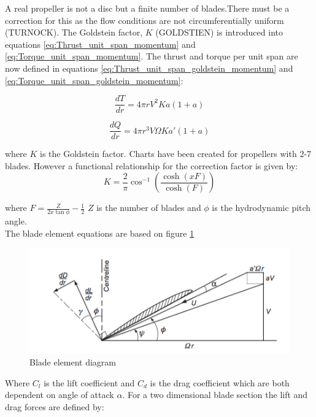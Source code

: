 \documentclass[]{report}
\begin{document}
A real propeller is not a disc but a finite number of blades.There must be a correction for this as the flow conditions are not circumferentially uniform (TURNOCK). The Goldstein factor, $K$ (GOLDSTIEN) is introduced into equations \ref{eq:Thrust_unit_span_momentum} and \ref{eq:Torque_unit_span_momentum}. The thrust and torque per unit span are now defined in equations \ref{eq:Thrust_unit_span_goldstein_momentum} and \ref{eq:Torque_unit_span_goldstein_momentum}:

\begin{equation}
\frac{dT}{dr} = 4 \pi r V^2 K a (1 + a)
\label{eq:Thrust_unit_span_goldstein_momentum}
\end{equation}

\begin{equation}
\frac{dQ}{dr} = 4 \pi r^3 V \Omega K a' (1 + a)
\label{eq:Torque_unit_span_goldstein_momentum}
\end{equation}

where $K$ is the Goldstein factor. Charts have been created for propellers with 2-7 blades. However a functional relationship for the correction factor is given by: 
\begin{equation}
K = \frac{2}{\pi} \cos^{-1}(\frac{\cosh(xF)}{\cosh(F)})
\end{equation} 

where $F = \frac{Z}{2x \tan \phi} -\frac{1}{2}$ $Z$ is the number of blades and $\phi$ is the hydrodynamic pitch angle.
\\
The blade element equations are based on figure \ref{fig:blade_element}

\begin{figure}
	\centering
	\includegraphics[scale=0.5]{blade_element}
	\caption{Blade element diagram}
	\label{fig:blade_element}
\end{figure}

Where $C_l$ is the lift coefficient and $C_d$ is the drag coefficient which are both dependent on angle of attack $\alpha$. For a two dimensional blade section the lift and drag forces are defined by:
\end{document}
